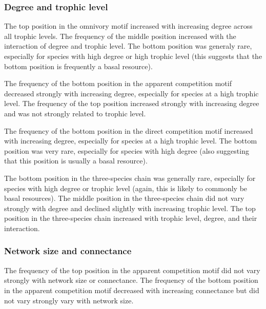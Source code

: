 \documentclass[12pt]{article}
\begin{document}
\begin{spacing}{2.0}
        \subsubsection*{Degree and trophic level}
        
            The top position in the omnivory motif increased with increasing degree across all trophic levels.
            The frequency of the middle position increased with the interaction of degree and trophic level.
            The bottom position was generaly rare, especially for species with high degree or high trophic level (this suggests that the bottom position is frequently a basal resource).
            
            
            The frequency of the bottom position in the apparent competition motif decreased strongly with increasing degree, especially for species at a high trophic level.
            The frequency of the top position increased strongly with increasing degree and was not strongly related to trophic level.
            
            
            The frequency of the bottom position in the direct competition motif increased with increasing degree, especially for species at a high trophic level.
            The bottom position was very rare, especially for species with high degree (also suggesting that this position is usually a basal resource).
            
            
            The bottom position in the three-species chain was generally rare, especially for species with high degree or trophic level (again, this is likely to commonly be basal resources).
            The middle position in the three-species chain did not vary strongly with degree and declined slightly with increasing trophic level.
            The top position in the three-species chain increased with trophic level, degree, and their interaction. 
        
    
        \subsubsection*{Network size and connectance}

            The frequency of the top position in the apparent competition motif did not vary strongly with network size or connectance.
            The frequency of the bottom position in the apparent competition motif decreased with increasing connectance but did not vary strongly vary with network size.
            

\end{spacing}
\end{document}

